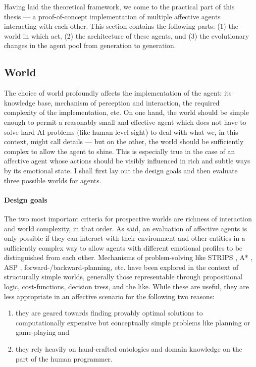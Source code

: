 Having laid the theoretical framework, we come to the practical part of this thesis --- a proof-of-concept implementation of multiple affective agents interacting with each other. This section contains the following parts: (1) the world in which act, (2) the architecture of these agents, and (3) the evolutionary changes in the agent pool from generation to generation.

\subsection{World}

The choice of world profoundly affects the implementation of the agent: its knowledge base, mechanism of perception and interaction, the required complexity of the implementation, etc. On one hand, the world should be simple enough to permit a reasonably small and effective agent which does not have to solve hard AI problems (like human-level sight) to deal with what we, in this context, might call details --- but on the other, the world should be sufficiently complex to allow the agent to shine. This is especially true in the case of an affective agent whose actions should be visibly influenced in rich and subtle ways by its emotional state. I shall first lay out the design goals and then evaluate three possible worlds for agents.

\paragraph{Design goals} The two most important criteria for prospective worlds are richness of interaction and world complexity, in that order. As said, an evaluation of affective agents is only possible if they can interact with their environment and other entities in a sufficiently complex way to allow agents with different emotional profiles to be distinguished from each other. Mechanisms of problem-solving like STRIPS \cite{fikesNilsson}, A* \cite{nilssonAStar}, ASP \cite{lifschitz}, forward-/backward-planning, etc. have been explored in the context of structurally simple worlds, generally those representable through propositional logic, cost-functions, decision tress, and the like. While these are useful, they are less appropriate in an affective scenario for the following two reasons:

\begin{enumerate}
	\item they are geared towards finding provably optimal solutions to computationally expensive but conceptually simple problems like planning or game-playing and
	\item they rely heavily on hand-crafted ontologies and domain knowledge on the part of the human programmer.
\end{enumerate}

